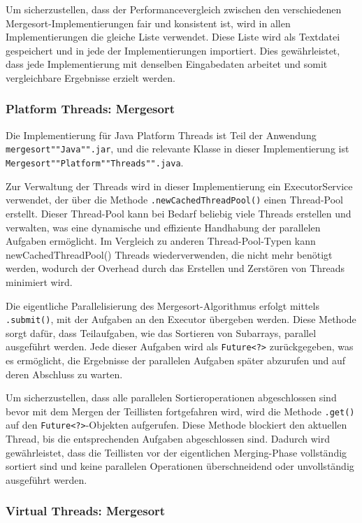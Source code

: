 \documentclass[fontsize=12pt,paper=a4,twoside=semi,parskip=half-,headsepline,headinclude]{scrreprt}
\begin{document}
Um sicherzustellen, dass der Performancevergleich zwischen den verschiedenen Mergesort-Implementierungen fair und konsistent ist, wird in allen Implementierungen die gleiche Liste verwendet. Diese Liste wird als Textdatei  gespeichert und in jede der Implementierungen importiert. Dies gewährleistet, dass jede Implementierung mit denselben Eingabedaten arbeitet und somit vergleichbare Ergebnisse erzielt werden.

\subsubsection{Platform Threads: Mergesort}

Die Implementierung für Java Platform Threads ist Teil der Anwendung \texttt{mergesort""Java"".jar}, und die relevante Klasse in dieser Implementierung ist \texttt{Mergesort""Platform""Threads"".java}.

Zur Verwaltung der Threads wird in dieser Implementierung ein ExecutorService verwendet, der über die Methode \texttt{.newCachedThreadPool()} einen Thread-Pool erstellt. Dieser Thread-Pool kann bei Bedarf beliebig viele Threads erstellen und verwalten, was eine dynamische und effiziente Handhabung der parallelen Aufgaben ermöglicht. Im Vergleich zu anderen Thread-Pool-Typen kann newCachedThreadPool() Threads wiederverwenden, die nicht mehr benötigt werden, wodurch der Overhead durch das Erstellen und Zerstören von Threads minimiert wird.

Die eigentliche Parallelisierung des Mergesort-Algorithmus erfolgt mittels \texttt{.submit()}, mit der Aufgaben an den Executor übergeben werden. Diese Methode sorgt dafür, dass Teilaufgaben, wie das Sortieren von Subarrays, parallel ausgeführt werden. Jede dieser Aufgaben wird als \texttt{Future<?>} zurückgegeben, was es ermöglicht, die Ergebnisse der parallelen Aufgaben später abzurufen und auf deren Abschluss zu warten.

Um sicherzustellen, dass alle parallelen Sortieroperationen abgeschlossen sind bevor mit dem Mergen der Teillisten fortgefahren wird, wird die Methode \texttt{.get()} auf den \texttt{Future<?>}-Objekten aufgerufen. Diese Methode blockiert den aktuellen Thread, bis die entsprechenden Aufgaben abgeschlossen sind. Dadurch wird gewährleistet, dass die Teillisten vor der eigentlichen Merging-Phase vollständig sortiert sind und keine parallelen Operationen über\-schnei\-dend oder unvollständig ausgeführt werden.

\subsubsection{Virtual Threads: Mergesort}
\end{document}
